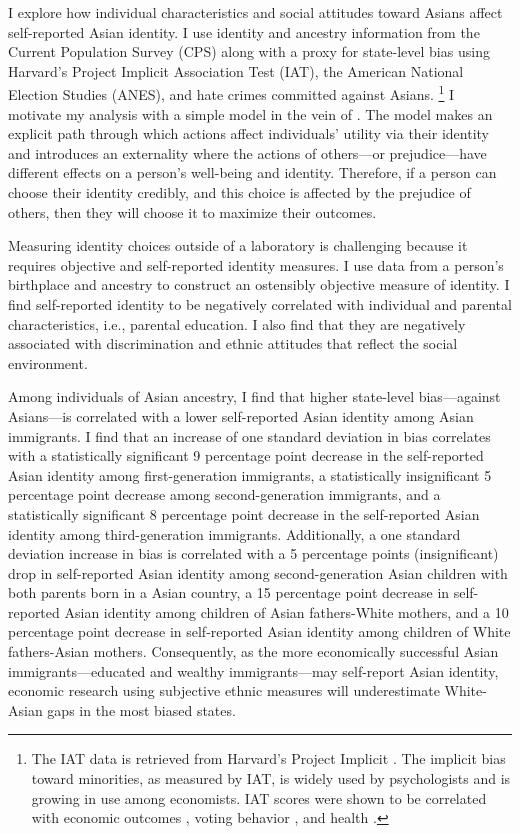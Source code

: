 I explore how individual characteristics and social attitudes toward Asians affect self-reported Asian identity. I use identity and ancestry information from the Current Population Survey (CPS) along with a proxy for state-level bias using Harvard's Project Implicit Association Test (IAT), the American National Election Studies (ANES), and hate crimes committed against Asians. \footnote{The IAT data is retrieved from Harvard's Project Implicit \autocite{greenwaldMeasuringIndividualDifferences1998}. The implicit bias toward minorities, as measured by IAT, is widely used by psychologists and is growing in use among economists. IAT scores were shown to be correlated with economic outcomes \autocite{chettyRaceEconomicOpportunity2020,gloverDiscriminationSelfFulfillingProphecy2017}, voting behavior \autocite{friesePredictingVotingBehavior2007}, and health \autocite{leitnerRacialBiasAssociated2016}.} I motivate my analysis with a simple model in the vein of \textcite{akerlofEconomicsIdentity2000}. The model makes an explicit path through which actions affect individuals' utility via their identity and introduces an externality where the actions of others---or prejudice---have different effects on a person's well-being and identity. Therefore, if a person can choose their identity credibly, and this choice is affected by the prejudice of others, then they will choose it to maximize their outcomes.

Measuring identity choices outside of a laboratory is challenging because it requires objective and self-reported identity measures. I use data from a person's birthplace and ancestry to construct an ostensibly objective measure of identity. I find self-reported identity to be negatively correlated with individual and parental characteristics, i.e., parental education. I also find that they are negatively associated with discrimination and ethnic attitudes that reflect the social environment. 

Among individuals of Asian ancestry, I find that higher state-level bias---against Asians---is correlated with a lower self-reported Asian identity among Asian immigrants. I find that an increase of one standard deviation in bias correlates with a statistically significant 9 percentage point decrease in the self-reported Asian identity among first-generation immigrants, a statistically insignificant 5 percentage point decrease among second-generation immigrants, and a statistically significant 8 percentage point decrease in the self-reported Asian identity among third-generation immigrants. Additionally, a one standard deviation increase in bias is correlated with a 5 percentage points (insignificant) drop in self-reported Asian identity among second-generation Asian children with both parents born in a Asian country, a 15 percentage point decrease in self-reported Asian identity among children of Asian fathers-White mothers, and a 10 percentage point decrease in self-reported Asian identity among children of White fathers-Asian mothers. Consequently, as the more economically successful Asian immigrants---educated and wealthy immigrants---may self-report Asian identity, economic research using subjective ethnic measures will underestimate White-Asian gaps in the most biased states. 

